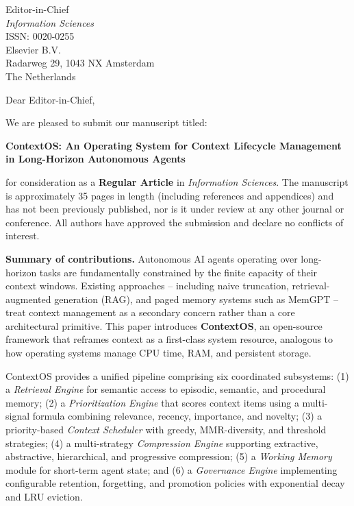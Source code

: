\documentclass[12pt, a4paper]{letter}
\begin{document}
\begin{letter}{
  Editor-in-Chief \\
  \textit{Information Sciences} \\
  ISSN: 0020-0255 \\
  Elsevier B.V. \\
  Radarweg 29, 1043 NX Amsterdam \\
  The Netherlands
}

\opening{Dear Editor-in-Chief,}

We are pleased to submit our manuscript titled:

\begin{center}
\textbf{ContextOS: An Operating System for Context Lifecycle Management\\
in Long-Horizon Autonomous Agents}
\end{center}

for consideration as a \textbf{Regular Article} in \textit{Information
Sciences}.  The manuscript is approximately 35 pages in length (including
references and appendices) and has not been previously published, nor is it
under review at any other journal or conference.  All authors have approved
the submission and declare no conflicts of interest.

\textbf{Summary of contributions.}  Autonomous AI agents operating over
long-horizon tasks are fundamentally constrained by the finite capacity of
their context windows.  Existing approaches -- including naive truncation,
retrieval-augmented generation (RAG), and paged memory systems such as MemGPT
-- treat context management as a secondary concern rather than a core
architectural primitive.  This paper introduces \textbf{ContextOS}, an
open-source framework that reframes context as a first-class system resource,
analogous to how operating systems manage CPU time, RAM, and persistent
storage.

ContextOS provides a unified pipeline comprising six coordinated subsystems:
(1) a \emph{Retrieval Engine} for semantic access to episodic, semantic, and
procedural memory; (2) a \emph{Prioritization Engine} that scores context
items using a multi-signal formula combining relevance, recency, importance,
and novelty; (3) a priority-based \emph{Context Scheduler} with greedy,
MMR-diversity, and threshold strategies; (4) a multi-strategy
\emph{Compression Engine} supporting extractive, abstractive, hierarchical,
and progressive compression; (5) a \emph{Working Memory} module for
short-term agent state; and (6) a \emph{Governance Engine} implementing
configurable retention, forgetting, and promotion policies with exponential
decay and LRU eviction.


\end{letter}
\end{document}
